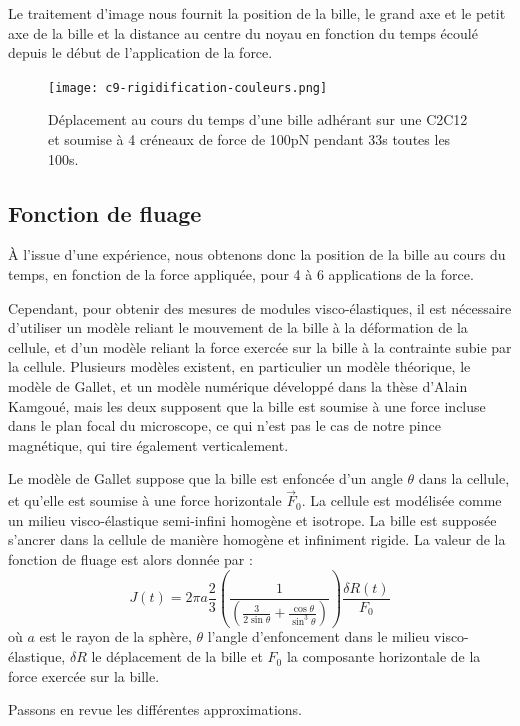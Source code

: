 	Le traitement d'image nous fournit la position de la bille, le grand axe et le petit axe de la bille et la distance au centre du noyau en fonction du temps écoulé depuis le début de l'application de la force. 
	
	
	\begin{figure}
	\texttt{[image: c9-rigidification-couleurs.png]}
	\caption{Déplacement au cours du temps d'une bille adhérant sur une C2C12 et soumise à 4 créneaux de force de 100pN pendant 33s toutes les 100s. }
	\end{figure}
	\subsection{Fonction de fluage}
	\`A l'issue d'une expérience, nous obtenons donc la position de la bille au cours du temps, en fonction de la force appliquée, pour 4 à 6 applications de la force. 
	
	Cependant, pour obtenir des mesures de modules visco-élastiques, il est nécessaire d'utiliser un modèle reliant le mouvement de la bille à la déformation de la cellule, et d'un modèle reliant la force exercée sur la bille à la contrainte subie par la cellule.
	Plusieurs modèles existent, en particulier un modèle théorique, le modèle de Gallet, et un modèle numérique développé dans la thèse d'Alain Kamgoué, mais les deux supposent que la bille est soumise à une force incluse dans le plan focal du microscope, ce qui n'est pas le cas de notre pince magnétique, qui tire également verticalement. 
	
	Le modèle de Gallet suppose que la bille est enfoncée d'un angle $\theta$ dans la cellule, et qu'elle est soumise à une force horizontale $\vec{F}_0$. La cellule est modélisée comme un milieu visco-élastique semi-infini homogène et isotrope. La bille est supposée s'ancrer dans la cellule de manière homogène et infiniment rigide. 
	La valeur de la fonction de fluage est alors donnée par : 
	\begin{equation}
	J(t)=2\pi a \frac{2}{3}\left(\frac{1}{\left( \frac{3}{2 \sin \theta}+\frac{\cos \theta}{\sin^3 \theta}\right)} \right)  \frac{\delta R(t)}{F_0} 
	\label{Fluage}
	\end{equation}
	où $a$ est le rayon de la sphère, $\theta$ l'angle d'enfoncement dans le milieu visco-élastique, $\delta R$ le déplacement de la bille et $F_0$ la composante horizontale de la force exercée sur la bille. 
	
	Passons en revue les différentes approximations.
	

